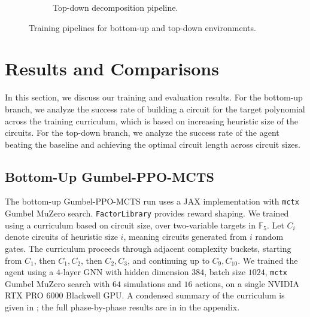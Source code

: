 \documentclass{article}
\theoremstyle{definition}
\theoremstyle{remark}
\begin{document}
\begin{figure}[t]
\begin{subfigure}[t]{0.48\textwidth}
\caption{Top-down decomposition pipeline.}
\label{fig:top-down-training-pipeline}
\end{subfigure}
\caption{Training pipelines for bottom-up and top-down environments.}
\label{fig:training-pipelines}
\end{figure}

\section{Results and Comparisons}
\label{sec:results}

In this section, we discuss our training and evaluation results. For the bottom-up branch, we analyze the success rate of building a circuit for the target polynomial across the training curriculum, which is based on increasing heuristic size of the circuits. For the top-down branch, we analyze the success rate of the agent beating the baseline and achieving the optimal circuit length across circuit sizes. 

\subsection{Bottom-Up Gumbel-PPO-MCTS}

The bottom-up Gumbel-PPO-MCTS run uses a JAX implementation with \texttt{mctx} Gumbel MuZero search. \texttt{FactorLibrary} provides reward shaping. We trained using a curriculum based on circuit size, over two-variable targets in \(\mathbb F_5\). Let $C_i$ denote circuits of heuristic size $i$, meaning circuits generated from $i$ random gates. The curriculum proceeds through adjacent complexity buckets, starting from \(C_1\), then \(C_1,C_2\), then \(C_2,C_3\), and continuing up to \(C_9,C_{10}\). We trained the agent using a \(4\)-layer GNN with hidden dimension \(384\), batch size \(1024\), \texttt{mctx} Gumbel MuZero search with \(64\) simulations and \(16\) actions, on a single NVIDIA RTX PRO 6000 Blackwell GPU. A condensed summary of the curriculum is given in ; the full phase-by-phase results are in  in the appendix.
\end{document}
